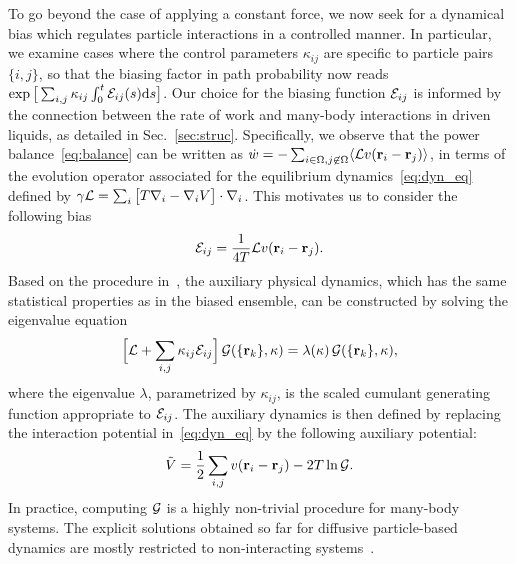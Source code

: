 \documentclass[superscriptaddress, twocolumn, prx, longbibliography, nofootinbib]{revtex4-1}
\begin{document}
To go beyond the case of applying a constant force, we now seek for a dynamical bias which regulates particle interactions in a controlled manner. In particular, we examine cases where the control parameters $\kappa_{ij}$ are specific to particle pairs $\{i,j\}$, so that the biasing factor in path probability now reads $\exp\big[\sum_{i,j}\kappa_{ij}\int_0^t{\cal E}_{ij}(s){\rm d}s\big]$. Our choice for the biasing function ${\cal E}_{ij}$ is informed by the connection between the rate of work and many-body interactions in driven liquids, as detailed in Sec.~\ref{sec:struc}. Specifically, we observe that the power balance~\eqref{eq:balance} can be written as $\dot w = - \sum_{i\in\Omega,j\not\in\Omega} \langle{\cal L} v({\bf r}_i-{\bf r}_j)\rangle$, in terms of the evolution operator associated for the equilibrium dynamics~\eqref{eq:dyn_eq} defined by $\gamma{\cal L} = \sum_i\big[ T \nabla_i - \nabla_i V\big] \cdot\nabla_i $. This motivates us to consider the following bias
\begin{equation}\label{eq:eps_bis}
	{\cal E}_{ij} = \frac{1}{4T} {\cal L} v({\bf r}_i-{\bf r}_j) .
\end{equation}
Based on the procedure in~\cite{Jack2010,Chetrite2013}, the auxiliary physical dynamics, which has the same statistical properties as in the biased ensemble, can be constructed by solving the eigenvalue equation 
\begin{equation}\label{eq:adjointbiased}
	\Big[ {\cal L} + \sum_{i,j}\kappa_{ij}{\cal E}_{ij} \Big]\,{\cal G}(\{{\bf r}_k\},\kappa) = \lambda(\kappa)\,{\cal G}(\{{\bf r}_k\},\kappa) ,
\end{equation}
where the eigenvalue $\lambda$, parametrized by $\kappa_{ij}$, is the scaled cumulant generating function appropriate to ${\cal E}_{ij}$. The auxiliary dynamics is then defined by replacing the interaction potential in~\eqref{eq:dyn_eq} by the following auxiliary potential:
\begin{equation} \label{eq:auxiliary}
	\tilde V = \frac{1}{2}\sum_{i,j} v({\bf r}_i-{\bf r}_j) - 2 T \ln{\cal G} .
\end{equation}
In practice, computing $\cal G$ is a highly non-trivial procedure for many-body systems. The explicit solutions obtained so far for diffusive particle-based dynamics are mostly restricted to non-interacting systems~\cite{Chetrite2013, Touchette2016}.
\end{document}
